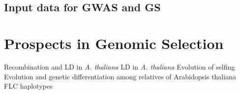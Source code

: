 \subsection{Input data for GWAS and GS}

\section{Prospects in Genomic Selection}



Recombination and LD in \textit{A. thaliana} \cite{kim2007recombination}
LD in \textit{A. thaliana} \cite{nordborg2002extent}
Evolution of selfing \cite{tang2007evolution}
Evolution and genetic differentiation among relatives of Arabidopsis thaliana \cite{koch2007evolution}
FLC haplotypes 







